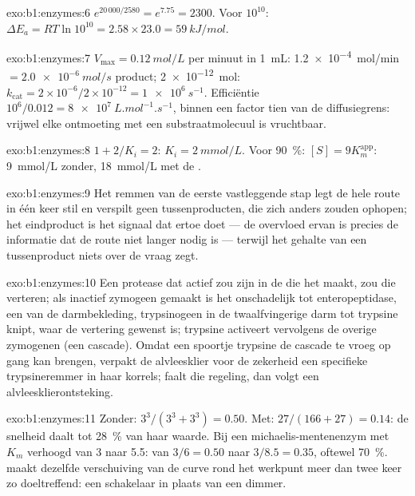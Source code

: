 \begin{solution}{exo:b1:enzymes:6}
$e^{20\,000/2580} = e^{7.75} = 2300$. Voor $10^{10}$: $\Delta E_a =
RT\ln 10^{10} = 2.58\times 23.0 = \qty{59}{kJ/mol}$.
\end{solution}

\begin{solution}{exo:b1:enzymes:7}
$V_{\max} = \qty{0.12}{mol/L}$ per minuut in \qty{1}{mL}:
\qty{1.2e-4}{mol/min} $= \qty{2.0e-6}{mol/s}$ product;  \qty{2e-12}{mol}:
$k_{\text{cat}} = 2\times 10^{-6}/2\times 10^{-12} =
\qty{1e6}{s^{-1}}$. Efficiëntie $10^6/0.012 = \qty{8e7}{L.mol^{-1}.s^{-1}}$,
binnen een factor tien van de diffusiegrens: vrijwel elke ontmoeting met een
substraatmolecuul is vruchtbaar.
\end{solution}

\begin{solution}{exo:b1:enzymes:8}
$1 + 2/K_i = 2$: $K_i = \qty{2}{mmol/L}$. Voor \qty{90}{\%}:
$[S] = 9K_m^{\text{app}}$: \qty{9}{mmol/L} zonder, \qty{18}{mmol/L} met de .
\end{solution}

\begin{solution}{exo:b1:enzymes:9}
Het remmen van de eerste vastleggende stap legt de hele route in één keer stil en
verspilt geen tussenproducten, die zich anders zouden ophopen; het eindproduct is
het signaal dat ertoe doet --- de overvloed ervan is precies de informatie dat de
route niet langer nodig is --- terwijl het gehalte van een tussenproduct niets
over de vraag zegt.
\end{solution}

\begin{solution}{exo:b1:enzymes:10}
Een protease dat actief zou zijn in de  die het maakt, zou die  verteren;
als inactief zymogeen gemaakt is het onschadelijk tot enteropeptidase, een 
van de darmbekleding, trypsinogeen in de twaalfvingerige darm tot trypsine knipt,
waar de vertering gewenst is; trypsine activeert vervolgens de overige zymogenen
(een cascade). Omdat een spoortje trypsine de cascade te vroeg op gang kan
brengen, verpakt de alvleesklier voor de zekerheid een specifieke trypsineremmer
in haar korrels; faalt die regeling, dan volgt een alvleesklierontsteking.
\end{solution}

\begin{solution}{exo:b1:enzymes:11}
Zonder: $3^3/(3^3 + 3^3) = 0.50$. Met: $27/(166 + 27) = 0.14$: de snelheid daalt
tot \qty{28}{\%} van haar waarde. Bij een michaelis-mentenenzym met $K_m$ verhoogd
van 3 naar 5.5: van $3/6 = 0.50$ naar $3/8.5 = 0.35$, oftewel \qty{70}{\%}.
 maakt dezelfde verschuiving van de curve rond het werkpunt meer
dan twee keer zo doeltreffend: een schakelaar in plaats van een dimmer.
\end{solution}

